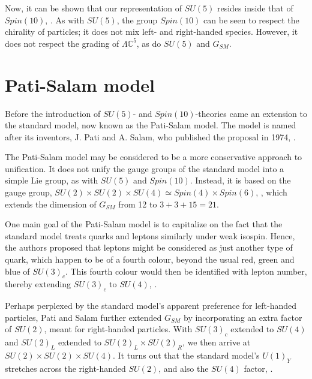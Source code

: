 \documentclass[letterpaper,12pt,titlepage,oneside,final]{book}
\newcommand{\C}{\mathbb{C}}
\begin{document}
Now, it can be shown that our representation of $SU(5)$ resides inside that of $Spin(10)$, \cite{agut}.  As with $SU(5)$, the group $Spin(10)$ can be seen to respect the chirality of particles;  it does not mix left- and right-handed species.  However, it does not respect the grading of $\Lambda \C^5$, as do $SU(5)$ and $G_{SM}$.






\section{Pati-Salam model  }





Before the introduction of $SU(5)$- and $Spin(10)$-theories came an extension to the standard model, now known as the Pati-Salam model.  The model is named after its inventors, J. Pati and A. Salam, who published the proposal in 1974, \cite{ps}.  

The Pati-Salam model may be considered to be a more conservative approach to unification.  It does not unify the gauge groups of the standard model into a simple Lie group, as with $SU(5)$ and $Spin (10)$.  Instead, it is based on the gauge group, $SU(2)\times SU(2) \times SU(4) \simeq Spin(4)\times Spin(6)$, \cite{agut}, which extends the dimension of $G_{SM}$ from 12 to $3+3+15=21$.  

One main goal of the Pati-Salam model is to capitalize on the fact that the standard model treats quarks and leptons similarly under weak isospin.  Hence, the authors proposed that leptons might be considered as just another type of quark, which happen to be of a fourth colour, beyond the usual red, green and blue of $SU(3)_c$.  This fourth colour would then be identified with  lepton number, thereby extending $SU(3)_c$ to $SU(4)$, \cite{ps}.


Perhaps perplexed by the standard model's apparent preference for left-handed particles, Pati and Salam further extended $G_{SM}$ by incorporating an extra factor of $SU(2)$, meant for right-handed particles.  With $SU(3)_c$ extended to $SU(4)$ and $SU(2)_L$ extended to $SU(2)_L\times SU(2)_R$, we then arrive at $SU(2)\times SU(2) \times SU(4)$.  It turns out that the standard model's $U(1)_Y$ stretches across the right-handed $SU(2)$, and also the $SU(4)$ factor, \cite{agut}.  
\end{document}
